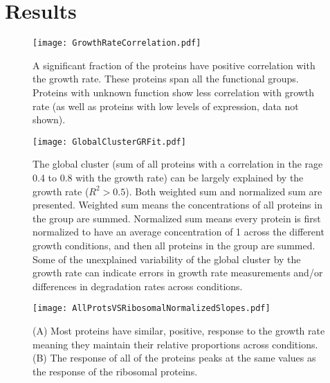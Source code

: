 \documentclass[notitlepage]{article}
\begin{document}
\section{Results}

\begin{figure}[h]
\centering
\texttt{[image: GrowthRateCorrelation.pdf]}
\caption{
A significant fraction of the proteins have positive correlation with the growth rate.
These proteins span all the functional groups.
Proteins with unknown function show less correlation with growth rate (as well as proteins with low levels of expression, data not shown).
}
\label{growth-corr}
\end{figure}

\begin{figure}[h]
\centering
\texttt{[image: GlobalClusterGRFit.pdf]}
\caption{
The global cluster (sum of all proteins with a correlation in the rage 0.4 to 0.8 with the growth rate) can be largely explained by the growth rate ($R^2>0.5$).
Both weighted sum and normalized sum are presented.
Weighted sum means the concentrations of all proteins in the group are summed.
Normalized sum means every protein is first normalized to have an average concentration of 1 across the different growth conditions, and then all proteins in the group are summed.
Some of the unexplained variability of the global cluster by the growth rate can indicate errors in growth rate measurements and/or differences in degradation rates across conditions.
}
\label{global-grcorr}
\end{figure}

\begin{figure}[h]
\centering
\texttt{[image: AllProtsVSRibosomalNormalizedSlopes.pdf]}
\caption{
    (A) Most proteins have similar, positive, response to the growth rate meaning they maintain their relative proportions across conditions.
    (B) The response of all of the proteins peaks at the same values as the response of the ribosomal proteins.
}
\label{global-fit}
\end{figure}
\end{document}
